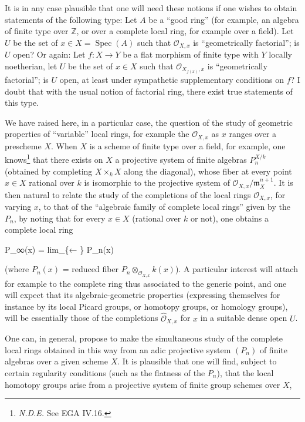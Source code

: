 \documentclass[
]{article}
\newenvironment{Shaded}{}{}
\newcommand{\NormalTok}[1]{#1}
\begin{document}
It is in any case plausible that one will need these notions if one
wishes to obtain statements of the following type: Let \(A\) be a ``good
ring'' (for example, an algebra of finite type over \(\mathbb{Z}\), or
over a complete local ring, for example over a field). Let \(U\) be the
set of \(x \in X = \operatorname{Spec}(A)\) such that
\(\mathcal{O}_{X,x}\) is ``geometrically factorial''; is \(U\) open? Or
again: Let \(f : X \to Y\) be a flat morphism of finite type with \(Y\)
locally noetherian, let \(U\) be the set of \(x \in X\) such that
\(\mathcal{O}_{X_{f(x)},x}\) is ``geometrically factorial''; is \(U\)
open, at least under sympathetic supplementary conditions on \(f\)? I
doubt that with the usual notion of factorial ring, there exist true
statements of this type.

We have raised here, in a particular case, the question of the study of
geometric properties of ``variable'' local rings, for example the
\(\mathcal{O}_{X,x}\) as \(x\) ranges over a prescheme \(X\). When \(X\)
is a scheme of finite type over a field, for example, one
knows\footnote{\emph{N.D.E.} See EGA IV.16.} that there exists on \(X\)
a projective system of finite algebras \(P^{X/k}_{n}\) (obtained by
completing \(X \times_{k} X\) along the diagonal), whose fiber at every
point \(x \in X\) rational over \(k\) is isomorphic to the projective
system of \(\mathcal{O}_{X,x}/\mathfrak{m}^{n+1}_{X}\). It is then
natural to relate the study of the completions of the local rings
\(\mathcal{O}_{X,x}\), for varying \(x\), to that of the ``algebraic
family of complete local rings'' given by the \(P_{n}\), by noting that
for every \(x \in X\) (rational over \(k\) or not), one obtains a
complete local ring

\begin{Shaded}
\begin{Highlighting}[]
\NormalTok{P\_∞(x) = lim\_\{← \} P\_n(x)}
\end{Highlighting}
\end{Shaded}

(where \(P_{n}(x)\) = reduced fiber
\(P_{n} \otimes_{\mathcal{O}_{X,x}} k(x)\)). A particular interest will
attach for example to the complete ring thus associated to the generic
point, and one will expect that its algebraic-geometric properties
(expressing themselves for instance by its local Picard groups, or
homotopy groups, or homology groups), will be essentially those of the
completions \(\hat{\mathcal{O}}_{X,x}\) for \(x\) in a suitable dense
open \(U\).

One can, in general, propose to make the simultaneous study of the
complete local rings obtained in this way from an adic projective system
\((P_{n})\) of finite algebras over a given scheme \(X\). It is
plausible that one will find, subject to certain regularity conditions
(such as the flatness of the \(P_{n}\)), that the local homotopy groups
arise from a projective system of finite group schemes over \(X\),
\end{document}
